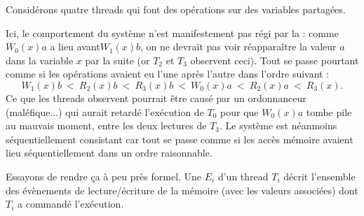 \begin{myexample}
  Considérons quatre threads qui font des opérations sur des variables
  partagées.
\begin{center}
\end{center}

Ici, le comportement du système n'est manifestement pas régi par la
 : comme $W_0(x)a$ a lieu \og avant\fg $W_1(x)b$, on
ne devrait pas voir réapparaître la valeur $a$ dans la variable $x$ par la suite
(or $T_2$ et $T_3$ observent ceci). Tout se passe pourtant comme si les
opérations avaient eu l'une après l'autre dans l'ordre suivant :
\[
W_1(x)b ~ < ~  R_2(x)b ~ < ~  R_3(x)b ~ < ~ 
W_0(x)a ~ < ~  R_2(x)a ~ < ~  R_3(x).
\]
Ce que les threads observent pourrait être causé par un ordonnanceur
(maléfique...) qui aurait retardé l'exécution de $T_0$ pour que $W_0(x)a$ tombe
pile au mauvais moment, entre les deux lectures de $T_3$. Le système est
néanmoins séquentiellement consistant car tout se passe comme si les accès
mémoire avaient lieu séquentiellement dans un ordre raisonnable.
\end{myexample}

Essayons de rendre ça à peu près formel. Une  $E_i$ d'un
thread $T_i$ décrit l'ensemble des évènements de lecture/écriture de la mémoire
(avec les valeurs associées) dont $T_i$ a commandé l'exécution.

